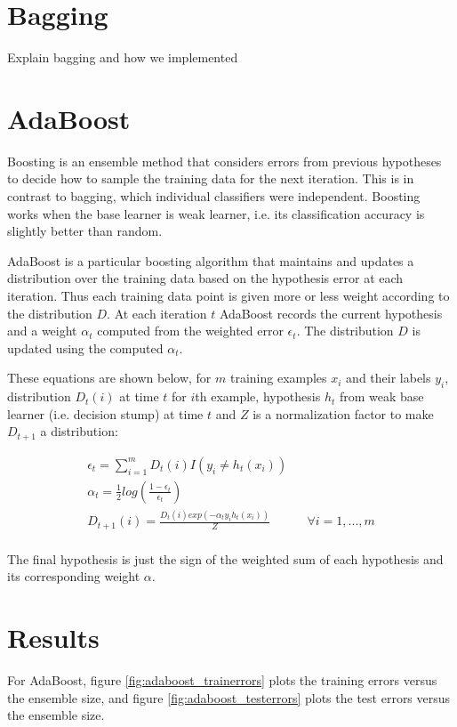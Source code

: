 \documentclass[12pt]{article}
\begin{document}
\section{Bagging}
Explain bagging and how we implemented

\section{AdaBoost}
Boosting is an ensemble method that considers errors from previous hypotheses to decide how to sample the training data for the next iteration. This is in contrast to bagging, which individual classifiers were independent. Boosting works when the base learner is weak learner, i.e. its classification accuracy is slightly better than random.

AdaBoost is a particular boosting algorithm that maintains and updates a distribution over the training data based on the hypothesis error at each iteration. Thus each training data point is given more or less weight according to the distribution \(D\). At each iteration \(t\) AdaBoost records the current hypothesis and a weight \(\alpha_t\) computed from the weighted error \(\epsilon_t\). The distribution \(D\) is updated using the computed \(\alpha_t\).

These equations are shown below, for \(m\) training examples \(x_i\) and their labels \(y_i\), distribution \(D_t(i)\) at time \(t\) for \(i\)th example, hypothesis \(h_t\) from weak base learner (i.e. decision stump) at time \(t\) and \(Z\) is a normalization factor to make \(D_{t+1}\) a distribution:

\begin{align}
 \epsilon_t = \sum_{i=1}^{m} D_t(i) I(y_i \neq h_t(x_i)) \\
 \alpha_t = \frac{1}{2} log\left(\frac{1-\epsilon_t}{\epsilon_t}\right) \\
 D_{t+1}(i) = \frac{ D_{t}(i)exp(-\alpha_t y_i h_t(x_i)) }{Z} & & \forall i = 1,...,m \\
\end{align}

The final hypothesis is just the sign of the weighted sum of each hypothesis and its corresponding weight \(\alpha\).

\section{Results}
For AdaBoost, figure \ref{fig:adaboost_trainerrors} plots the training errors versus the ensemble size, and figure \ref{fig:adaboost_testerrors} plots the test errors versus the ensemble size.
\end{document}
